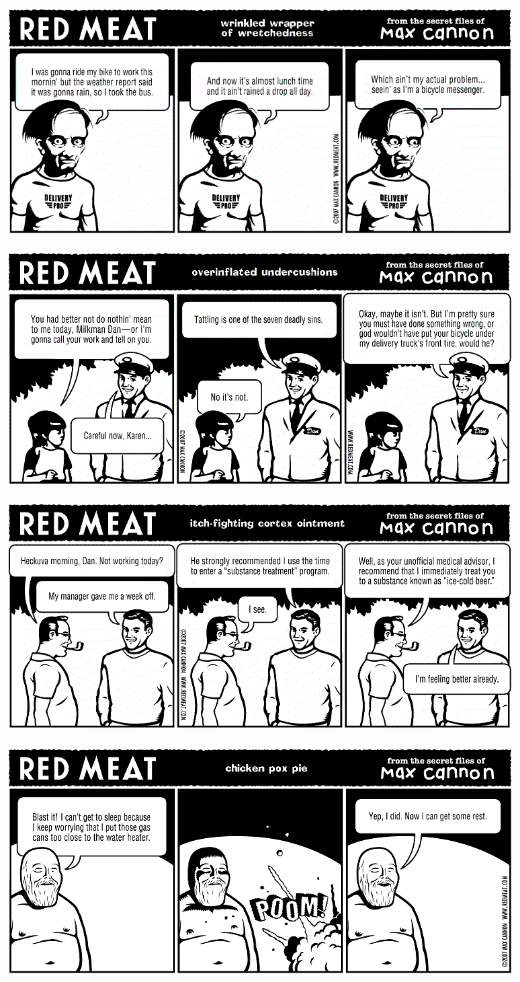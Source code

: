 \documentclass[a4paper,twoside,11pt]{article}
\begin{document}
\includegraphics[width=\textwidth]{redmeat_2007-03-13.png}



\includegraphics[width=\textwidth]{redmeat_2007-03-20.png}



\includegraphics[width=\textwidth]{redmeat_2007-03-27.png}



\includegraphics[width=\textwidth]{redmeat_2007-04-03.png}
\end{document}
